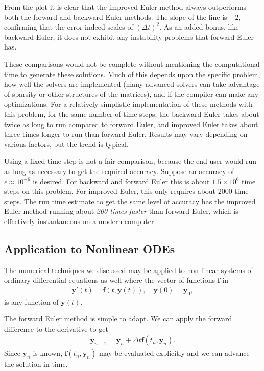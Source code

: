 From the plot it is clear that the improved Euler method always outperforms both the forward and backward Euler methods. The slope of the line is $-2$, confirming that the error indeed scales of $( \Delta t )^2$. As an added bonus, like backward Euler, it does not exhibit any instability problems that forward Euler has.

These comparisons would not be complete without mentioning the computational time to generate these solutions. Much of this depends upon the specific problem, how well the solvers are implemented (many advanced solvers can take advantage of sparsity or other structures of the matrices), and if the compiler can make any optimizations. For a relatively simplistic implementation of these methods with this problem, for the same number of time steps, the backward Euler takes about twice as long to run compared to forward Euler, and improved Euler takes about three times longer to run than forward Euler. Results may vary depending on various factors, but the trend is typical. 

Using a fixed time step is not a fair comparison, because the end user would run as long as necessary to get the required accuracy. Suppose an accuracy of $\epsilon \approx 10^{-6}$ is desired. For backward and forward Euler this is about $1.5 \times 10^6$ time steps on this problem. For improved Euler, this only requires about 2000 time steps. The run time estimate to get the same level of accuracy has the improved Euler method running about \emph{200 times faster} than forward Euler, which is effectively instantaneous on a modern computer.


\subsection{Application to Nonlinear ODEs}

The numerical techniques we discussed may be applied to non-linear systems of ordinary differential equations as well where the vector of functions $\mathbf{f}$ in
\begin{align}
  \mathbf{y}'(t) = \mathbf{f}( t, \mathbf{y}(t) ), \quad \mathbf{y}(0) = \mathbf{y}_0, \nonumber
\end{align}
is any function of $\mathbf{y}(t)$.

The forward Euler method is simple to adapt. We can apply the forward difference to the derivative to get
\begin{align}
  \mathbf{y}_{n+1} = \mathbf{y}_n + \Delta t \mathbf{f}( t_n, \mathbf{y}_n ).
\end{align}
Since $\mathbf{y}_n$ is known, $\mathbf{f}( t_n, \mathbf{y}_n )$ may be evaluated explicitly and we can advance the solution in time.

